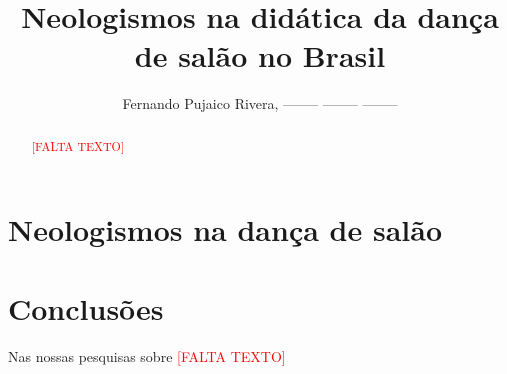\documentclass[a4paper,10pt]{article}
\title{Neologismos na didática da dança de salão no Brasil}
\author{Fernando Pujaico Rivera, -------- -------- --------}
\date{}
\newcommand{\FALTATEXTO}{\textcolor{red}{[FALTA TEXTO]}}
\begin{document}
\maketitle

\begin{abstract}
\FALTATEXTO
\end{abstract}







\section{Neologismos na dança de salão}


%

 
\section{Conclusões}
Nas nossas pesquisas sobre \FALTATEXTO

\medskip
 
\printbibliography
\end{document}
